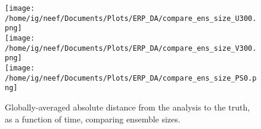 \documentclass[11pt]{report}
\begin{document}
\begin{figure}
  \noindent
  \texttt{[image: /home/ig/neef/Documents/Plots/ERP\_DA/compare\_ens\_size\_U300.png]} \\
  \texttt{[image: /home/ig/neef/Documents/Plots/ERP\_DA/compare\_ens\_size\_V300.png]} \\
  \texttt{[image: /home/ig/neef/Documents/Plots/ERP\_DA/compare\_ens\_size\_PS0.png]}  \\
   \caption{Globally-averaged absolute distance from the analysis to the truth, as a function of time, comparing ensemble sizes. }
   \label{fig:comp_enssize}
 \end{figure}



\end{document}
